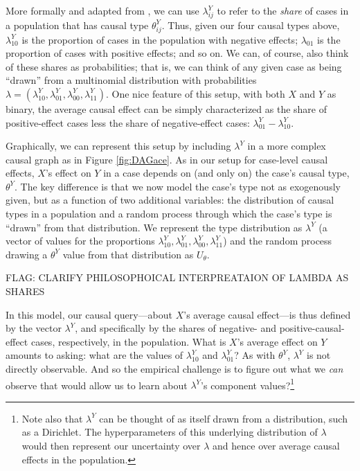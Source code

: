 \documentclass[12pt,]{book}
\let\rmarkdownfootnote\footnote%
\def\footnote{\protect\rmarkdownfootnote}
\begin{document}
More formally and adapted from \citet{humphreys2015mixing}, we can use \(\lambda^Y_{ij}\) to refer to the \emph{share} of cases in a population that has causal type \(\theta^Y_{ij}\). Thus, given our four causal types above, \(\lambda^Y_{10}\) is the proportion of cases in the population with negative effects; \(\lambda_{01}\) is the proportion of cases with positive effects; and so on. We can, of course, also think of these shares as probabilities; that is, we can think of any given case as being ``drawn'' from a multinomial distribution with probabilities \(\lambda = (\lambda^Y_{10}, \lambda^Y_{01}, \lambda^Y_{00}, \lambda^Y_{11})\). One nice feature of this setup, with both \(X\) and \(Y\) as binary, the average causal effect can be simply characterized as the share of positive-effect cases less the share of negative-effect cases: \(\lambda^Y_{01} - \lambda^Y_{10}\).

Graphically, we can represent this setup by including \(\lambda^Y\) in a more complex causal graph as in Figure \ref{fig:DAGace}. As in our setup for case-level causal effects, \(X\)'s effect on \(Y\) in a case depends on (and only on) the case's causal type, \(\theta^Y\). The key difference is that we now model the case's type not as exogenously given, but as a function of two additional variables: the distribution of causal types in a population and a random process through which the case's type is ``drawn'' from that distribution. We represent the type distribution as \(\lambda^Y\) (a vector of values for the proportions \(\lambda^Y_{10}, \lambda^Y_{01}, \lambda^Y_{00}, \lambda^Y_{11}\)) and the random process drawing a \(\theta^Y\) value from that distribution as \(U_\theta\).

FLAG: CLARIFY PHILOSOPHOICAL INTERPREATAION OF LAMBDA AS SHARES

In this model, our causal query---about \(X\)'s average causal effect---is thus defined by the vector \(\lambda^Y\), and specifically by the shares of negative- and positive-causal-effect cases, respectively, in the population. What is \(X\)'s average effect on \(Y\) amounts to asking: what are the values of \(\lambda^Y_{10}\) and \(\lambda^Y_{01}\)? As with \(\theta^Y\), \(\lambda^Y\) is not directly observable. And so the empirical challenge is to figure out what we \emph{can} observe that would allow us to learn about \(\lambda^Y\)'s component values?\footnote{Note also that \(\lambda^Y\) can be thought of as itself drawn from a distribution, such as a Dirichlet. The hyperparameters of this underlying distribution of \(\lambda\) would then represent our uncertainty over \(\lambda\) and hence over average causal effects in the population.}
\end{document}
